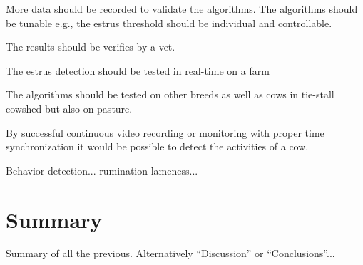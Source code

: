 \documentclass[english,12pt,a4paper,pdftex,elec,utf8]{aaltothesis}
\begin{document}
More data should be recorded to validate the algorithms. The algorithms should be tunable e.g., the estrus threshold should be individual and controllable.

The results should be verifies by a vet.

The estrus detection should be tested in real-time on a farm

The algorithms should be tested on other breeds as well as cows in tie-stall cowshed but also on pasture.

By successful continuous video recording or monitoring with proper time synchronization it would be possible to detect the activities of a cow. 

Behavior detection... rumination lameness...


\clearpage

\section{Summary} \label{summarysection}


Summary of all the previous. Alternatively ``Discussion'' or ``Conclusions''...


\clearpage

\thesisbibliography

%



\printbibliography




\clearpage

\thesisappendix


\end{document}
